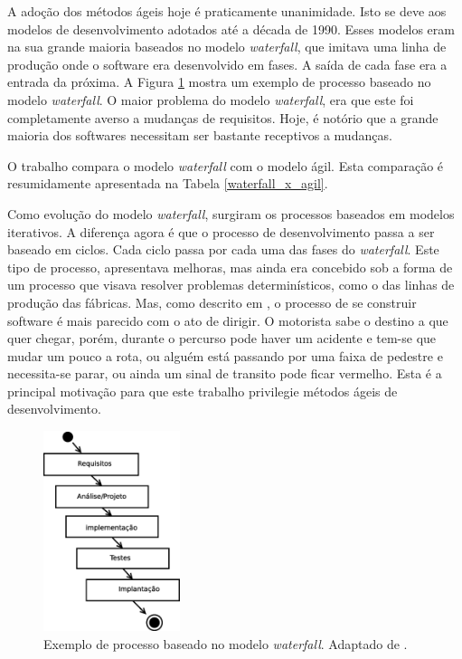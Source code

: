 A adoção dos métodos ágeis hoje é praticamente unanimidade. 
Isto se deve aos modelos de desenvolvimento adotados até a década de 1990. 
Esses modelos eram na sua grande maioria baseados no modelo \emph{waterfall}, que imitava uma linha de produção onde o software era desenvolvido em fases. 
A saída de cada fase era a entrada da próxima. 
A Figura \ref{waterfall} mostra um exemplo de processo baseado no modelo \emph{waterfall}.
O maior problema do modelo \emph{waterfall}, era que este foi completamente averso a mudanças de requisitos. 
Hoje, é notório que a grande maioria dos softwares necessitam ser bastante receptivos a mudanças.

O trabalho  compara o modelo \emph{waterfall} com o modelo ágil. 
Esta comparação é resumidamente apresentada na Tabela \ref{waterfall_x_agil}.

Como evolução do modelo \emph{waterfall}, surgiram os processos baseados em modelos iterativos. 
A diferença agora é que o processo de desenvolvimento passa a ser baseado em ciclos. 
Cada ciclo passa por cada uma das fases do \emph{waterfall}. 
Este tipo de processo, apresentava melhoras, mas ainda era concebido sob a forma de um processo que visava resolver problemas determinísticos, como o das linhas de produção das fábricas.
Mas, como descrito em , o processo de se construir software é mais parecido com o ato de dirigir.
O motorista sabe o destino a que quer chegar, porém, durante o percurso pode haver um acidente e tem-se que mudar um pouco a rota, ou alguém está passando por uma faixa de pedestre e necessita-se parar, ou ainda um sinal de transito pode ficar vermelho. 
Esta é a principal motivação para que este trabalho privilegie métodos ágeis de desenvolvimento.


\begin{figure}[ht]
	\centering
	\includegraphics[width=4cm]{figuras/waterfall.eps}
	\caption{Exemplo de processo baseado no modelo \emph{waterfall}. Adaptado de \cite{Pressman2014}.}
	\label{waterfall}
\end{figure}

